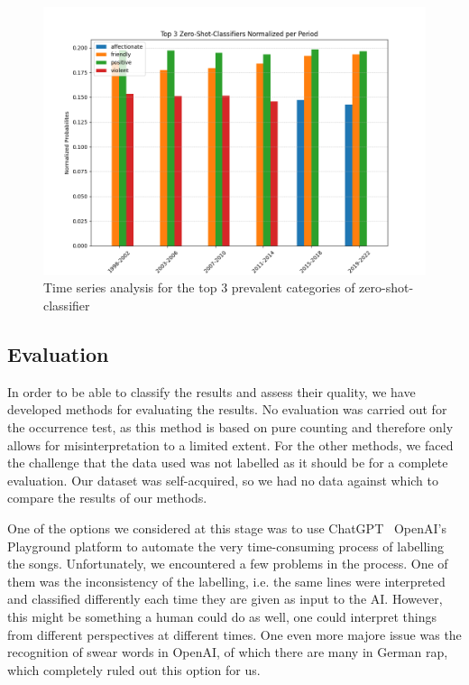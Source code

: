 \begin{figure}[!htb]
    \centering
    \includegraphics[width=\textwidth]{figures/top_3_time_series_zero_shot.png}
    \caption{Time series analysis for the top 3 prevalent categories of zero-shot-classifier}
    \label{fig:zero-shot2}
\end{figure}

\subsection*{Evaluation}

In order to be able to classify the results and assess their quality, we have developed methods for evaluating the results. No evaluation was carried out for the occurrence test, as this method is based on pure counting and therefore only allows for misinterpretation to a limited extent. For the other methods, we faced the challenge that the data used was not labelled as it should be for a complete evaluation. Our dataset was self-acquired, so we had no data against which to compare the results of our methods.

One of the options we considered at this stage was to use ChatGPT \ OpenAI's Playground platform to automate the very time-consuming process of labelling the songs. Unfortunately, we encountered a few problems in the process. One of them was the inconsistency of the labelling, i.e. the same lines were interpreted and classified differently each time they are given as input to the AI. However, this might be something a human could do as well, one could interpret things from different perspectives at different times. One even more majore issue was the recognition of swear words in OpenAI, of which there are many in German rap, which completely ruled out this option for us.


